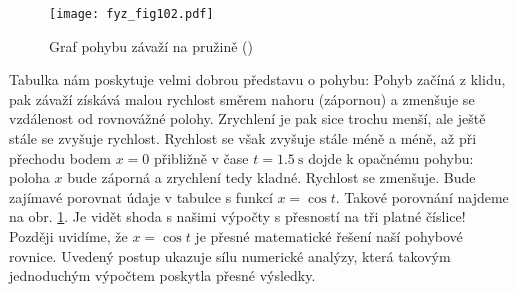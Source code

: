{{    
    \begin{figure}[ht!]  %
      \centering
      \texttt{[image: fyz\_fig102.pdf]}
      \caption{Graf pohybu závaží na pružině (\cite[s.~129]{Feynman01})}
      \label{fyz:fig102}
    \end{figure}
    
    Tabulka nám poskytuje velmi dobrou představu o pohybu: Pohyb začíná z klidu, pak závaží získává 
    malou rychlost směrem nahoru (zápornou) a zmenšuje se vzdálenost od rovnovážné polohy. 
    Zrychlení je pak sice trochu menší, ale ještě stále se zvyšuje rychlost. Rychlost se však 
    zvyšuje stále méně a méně, až při přechodu bodem \(x = 0\) přibližně v čase \(t = 
    \SI{1.5}{\s}\) dojde k opačnému pohybu: poloha \(x\) bude záporná a zrychlení tedy kladné. 
    Rychlost se zmenšuje. Bude zajímavé porovnat údaje v tabulce s funkcí \(x = \cos t\). Takové 
    porovnání najdeme na obr. \ref{fyz:fig102}. Je vidět shoda s našimi výpočty s přesností na tři 
    platné číslice! Později uvidíme, že \(x = \cos t\) je přesné matematické řešení naší pohybové 
    rovnice. Uvedený postup ukazuje sílu numerické analýzy, která takovým jednoduchým výpočtem 
    poskytla přesné výsledky.
    
}}
